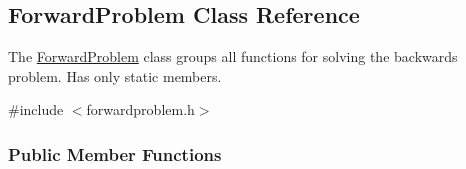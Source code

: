 \hypertarget{classamici_1_1_forward_problem}{}\subsection{Forward\+Problem Class Reference}
\label{classamici_1_1_forward_problem}


The \mbox{\hyperlink{classamici_1_1_forward_problem}{Forward\+Problem}} class groups all functions for solving the backwards problem. Has only static members.  




{\ttfamily \#include $<$forwardproblem.\+h$>$}

\subsubsection*{Public Member Functions}
